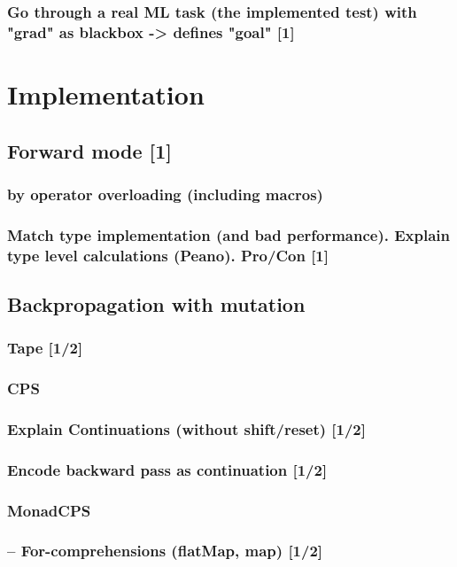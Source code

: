 \documentclass[
	english,
	class=report,custommargins=true,marginpar=false,
	accentcolor=9c,%
	thesis={type=bachelor},%
	fontsize=11pt,%
]{tudapub}
\begin{document}
		\subsection{Go through a real ML task (the implemented test) with "grad" as blackbox -> defines "goal" [1]}
% 

\chapter{Implementation}
	\section{Forward mode [1]}
		\subsection{by operator overloading (including macros)}
		\subsection{Match type implementation (and bad performance). Explain type level calculations (Peano). Pro/Con [1]}

	\section{Backpropagation with mutation}
		\subsection{Tape [1/2]} %
		\subsection{CPS}
			\subsection{Explain Continuations (without shift/reset) [1/2]}
			\subsection{Encode backward pass as continuation [1/2]}
		\subsection{MonadCPS}
			\subsection{ -- For-comprehensions (flatMap, map) [1/2]}
\end{document}
